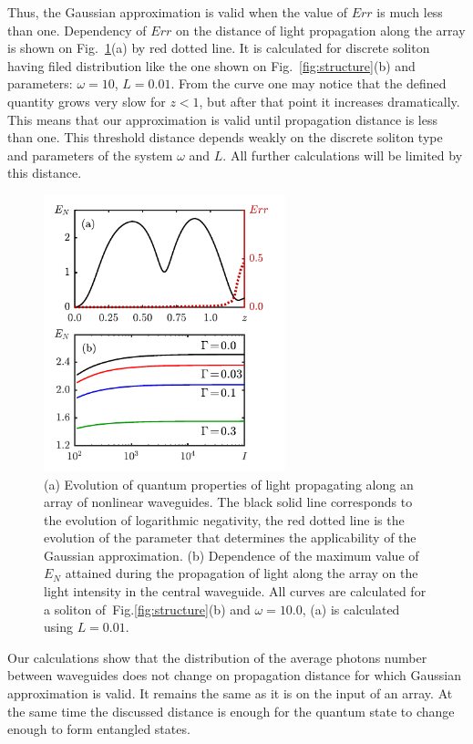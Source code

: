 \documentclass[9pt,twocolumn,twoside]{osajnl}
\begin{document}
Thus, the Gaussian approximation is valid when the value of $Err$ is much less than one.
Dependency of $Err$ on the distance of light propagation along the array is shown on Fig.~\ref{fig:results}(a) by red dotted line. It is calculated for discrete soliton having filed distribution like the one shown on Fig.~\ref{fig:structure}(b) and parameters: $\omega = 10$, $L=0.01$.
From the curve one may notice that the defined quantity grows very slow for $z<1$, but after that point it increases dramatically.
This means that our approximation is valid until propagation distance is less than one.
This threshold distance depends weakly on the discrete soliton type and parameters of the system $\omega$ and $L$. 
All further calculations will be limited by this distance.
\par
\begin{figure}[h!]
	\centering\includegraphics[width=7cm]{fig3}
	\caption{(a) Evolution of quantum properties of light propagating along an array of nonlinear waveguides. 
		The black solid line corresponds to the evolution of logarithmic negativity, the red dotted line is the evolution of the parameter that determines the applicability of the Gaussian approximation. (b) Dependence of the maximum value of $E_N$ attained during the propagation of light along the array on the light intensity in the central waveguide. All curves are calculated for a soliton of~Fig.\ref{fig:structure}(b) and $\omega=10.0$, (a) is calculated using $L=0.01$.} 
	\label{fig:results}
\end{figure}
Our calculations show that the distribution of the average photons number between waveguides does not change on propagation distance for which Gaussian approximation is valid. 
It remains the same as it is on the input of an array. 
At the same time the discussed distance is enough for the quantum state to change enough to form entangled states.
\end{document}
